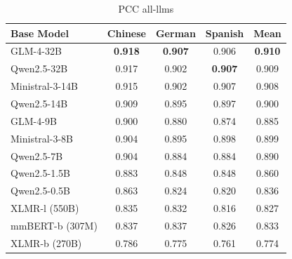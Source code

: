 \begin{table}[t]
\setlength{\tabcolsep}{3.1pt}
\footnotesize
\centering
\begin{tabularx}{\linewidth}{Xcccc}
\toprule
Base Model & Chinese & German & Spanish & Mean \\
\midrule
GLM-4-32B & \textbf{0.918} & \textbf{0.907} & 0.906 & \textbf{0.910} \\
Qwen2.5-32B & 0.917 & 0.902 & \textbf{0.907} & 0.909 \\
\midrule
Ministral-3-14B & 0.915 & 0.902 & 0.907 & 0.908 \\
Qwen2.5-14B & 0.909 & 0.895 & 0.897 & 0.900 \\
\midrule
GLM-4-9B & 0.900 & 0.880 & 0.874 & 0.885 \\
Ministral-3-8B & 0.904 & 0.895 & 0.898 & 0.899 \\
Qwen2.5-7B & 0.904 & 0.884 & 0.884 & 0.890 \\
\midrule
Qwen2.5-1.5B & 0.883 & 0.848 & 0.848 & 0.860 \\
\midrule
Qwen2.5-0.5B & 0.863 & 0.824 & 0.820 & 0.836 \\
XLMR-l (550B) & 0.835 & 0.832 & 0.816 & 0.827 \\
\midrule
mmBERT-b (307M) & 0.837 & 0.837 & 0.826 & 0.833 \\
XLMR-b (270B) & 0.786 & 0.775 & 0.761 & 0.774 \\
\bottomrule
\end{tabularx}
\caption{PCC all-llms}
\label{tab:pcc-all-llms}
\end{table}

